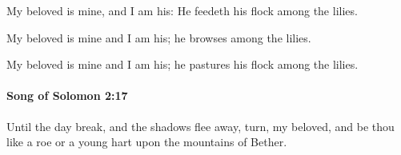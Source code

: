 			\begin{versebox}
					\item[BHS] 
					\item[LXX] 
					\item[ASV] My beloved is mine, and I am his: He feedeth his flock among the lilies.
					\item[NIV] My beloved is mine and I am his; he browses among the lilies.
					\item[NRSV] My beloved is mine and I am his; he pastures his flock among the lilies.
			\end{versebox}

		\paragraph{Song of Solomon 2:17} %
			\label{SONGOFSOLOMON-2-17}

			Until the day break, and the shadows flee away, turn, my beloved, and be thou like a roe or a young hart upon the mountains of Bether.

